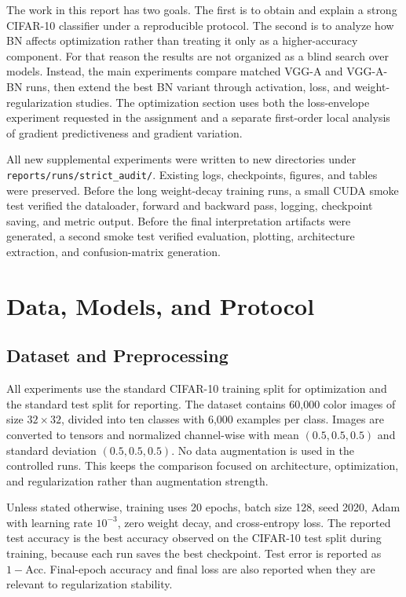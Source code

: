 \documentclass[10pt,twocolumn]{article}
\newcommand{\acc}{\mathrm{Acc}}
\begin{document}
The work in this report has two goals. The first is to obtain and explain a strong CIFAR-10 classifier under a reproducible protocol. The second is to analyze how BN affects optimization rather than treating it only as a higher-accuracy component. For that reason the results are not organized as a blind search over models. Instead, the main experiments compare matched VGG-A and VGG-A-BN runs, then extend the best BN variant through activation, loss, and weight-regularization studies. The optimization section uses both the loss-envelope experiment requested in the assignment and a separate first-order local analysis of gradient predictiveness and gradient variation.

All new supplemental experiments were written to new directories under \texttt{reports/runs/strict\_audit/}. Existing logs, checkpoints, figures, and tables were preserved. Before the long weight-decay training runs, a small CUDA smoke test verified the dataloader, forward and backward pass, logging, checkpoint saving, and metric output. Before the final interpretation artifacts were generated, a second smoke test verified evaluation, plotting, architecture extraction, and confusion-matrix generation.

\section{Data, Models, and Protocol}
\subsection{Dataset and Preprocessing}
All experiments use the standard CIFAR-10 training split for optimization and the standard test split for reporting. The dataset contains 60,000 color images of size $32\times32$, divided into ten classes with 6,000 examples per class. Images are converted to tensors and normalized channel-wise with mean $(0.5,0.5,0.5)$ and standard deviation $(0.5,0.5,0.5)$. No data augmentation is used in the controlled runs. This keeps the comparison focused on architecture, optimization, and regularization rather than augmentation strength.

Unless stated otherwise, training uses 20 epochs, batch size 128, seed 2020, Adam with learning rate $10^{-3}$, zero weight decay, and cross-entropy loss. The reported test accuracy is the best accuracy observed on the CIFAR-10 test split during training, because each run saves the best checkpoint. Test error is reported as $1-\acc$. Final-epoch accuracy and final loss are also reported when they are relevant to regularization stability.
\end{document}
